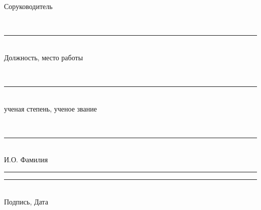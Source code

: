\begin{titlepage}
\noindent
\begin{minipage}[t]{0.42\textwidth}
\raggedright
Соруководитель

\vspace{0.18cm}
\strut\hseCoSupervisorTitle\\[-0.05cm]
\rule{6.1cm}{0.4pt}\\[-0.05cm]
{\scriptsize Должность, место работы}

\vspace{0.08cm}
\strut\hseCoSupervisorDegree\\[-0.05cm]
\rule{6.1cm}{0.4pt}\\[-0.05cm]
{\scriptsize ученая степень, ученое звание}

\vspace{0.08cm}
\strut\hseCoSupervisorName\\[-0.05cm]
\rule{6.1cm}{0.4pt}\\[-0.05cm]
{\scriptsize И.О. Фамилия}

\vspace{0.08cm}
\rule{3.6cm}{0.4pt}\quad\rule{2.2cm}{0.4pt}\\[-0.05cm]
{\scriptsize Подпись, Дата}
\end{minipage}
\hfill
\begin{minipage}[t]{0.42\textwidth}
\strut
\end{minipage}
\fi

\vfill

\begin{center}
\textbf{\hseCity{} \hseYear}
\end{center}
\end{titlepage}


\setcounter{page}{2}
\clearpage
